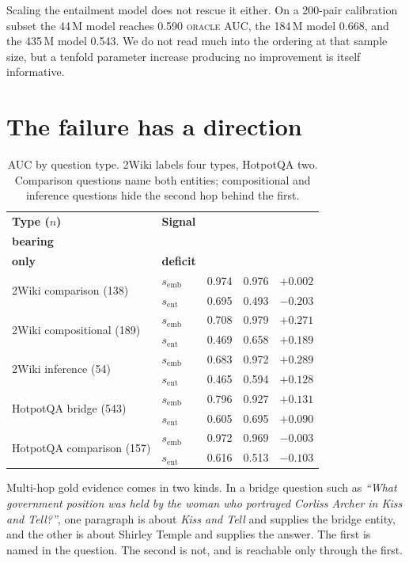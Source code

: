 \documentclass[conference]{IEEEtran}
\newcommand{\semb}{s_{\mathrm{emb}}}
\newcommand{\sent}{s_{\mathrm{ent}}}
\begin{document}
Scaling the entailment model does not rescue it either. On a 200-pair
calibration subset the 44\,M model reaches 0.590 \textsc{oracle} AUC, the
184\,M model 0.668, and the 435\,M model 0.543. We do not read much into the
ordering at that sample size, but a tenfold parameter increase producing no
improvement is itself informative.

\section{The failure has a direction}
\label{sec:direction}

\begin{table}[t]
\centering
\caption{AUC by question type. 2Wiki labels four types, HotpotQA two.
Comparison questions name both entities; compositional and inference questions
hide the second hop behind the first.}
\label{tab:qtype}
\setlength{\tabcolsep}{4pt}
\begin{tabular}{@{}llccc@{}}
\toprule
\textbf{Type ($n$)} & \textbf{Signal} &
\makecell{\textbf{answer-}\\\textbf{bearing}} & \makecell{\textbf{bridge}\\\textbf{only}} & \textbf{deficit}\\
\midrule
\multirow{2}{*}{2Wiki comparison (138)}
 & $\semb$   & 0.974 & 0.976 & $+0.002$\\
 & $\sent$   & 0.695 & 0.493 & $-0.203$\\
\multirow{2}{*}{2Wiki compositional (189)}
 & $\semb$   & 0.708 & 0.979 & $\mathbf{+0.271}$\\
 & $\sent$   & 0.469 & 0.658 & $+0.189$\\
\multirow{2}{*}{2Wiki inference (54)}
 & $\semb$   & 0.683 & 0.972 & $\mathbf{+0.289}$\\
 & $\sent$   & 0.465 & 0.594 & $+0.128$\\
\midrule
\multirow{2}{*}{HotpotQA bridge (543)}
 & $\semb$   & 0.796 & 0.927 & $+0.131$\\
 & $\sent$   & 0.605 & 0.695 & $+0.090$\\
\multirow{2}{*}{HotpotQA comparison (157)}
 & $\semb$   & 0.972 & 0.969 & $-0.003$\\
 & $\sent$   & 0.616 & 0.513 & $-0.103$\\
\bottomrule
\end{tabular}
\end{table}

Multi-hop gold evidence comes in two kinds. In a bridge question such as
\emph{``What government position was held by the woman who portrayed Corliss
Archer in Kiss and Tell?''}, one paragraph is about \emph{Kiss and Tell} and
supplies the bridge entity, and the other is about Shirley Temple and supplies
the answer. The first is named in the question. The second is not, and is
reachable only through the first.
\end{document}
